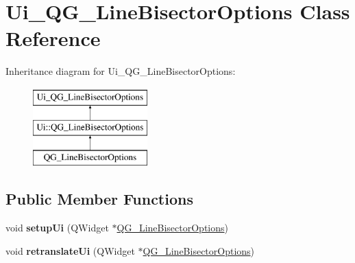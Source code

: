 \hypertarget{classUi__QG__LineBisectorOptions}{\section{Ui\-\_\-\-Q\-G\-\_\-\-Line\-Bisector\-Options Class Reference}
\label{classUi__QG__LineBisectorOptions}
}
Inheritance diagram for Ui\-\_\-\-Q\-G\-\_\-\-Line\-Bisector\-Options\-:\begin{figure}[H]
\begin{center}
\leavevmode
\includegraphics[height=3.000000cm]{classUi__QG__LineBisectorOptions}
\end{center}
\end{figure}
\subsection*{Public Member Functions}
\begin{DoxyCompactItemize}
\item 
\hypertarget{classUi__QG__LineBisectorOptions_a890c7c5da0795da01b5fa97848ee3d46}{void {\bfseries setup\-Ui} (Q\-Widget $\ast$\hyperlink{classQG__LineBisectorOptions}{Q\-G\-\_\-\-Line\-Bisector\-Options})}\label{classUi__QG__LineBisectorOptions_a890c7c5da0795da01b5fa97848ee3d46}

\item 
\hypertarget{classUi__QG__LineBisectorOptions_ad128d24b5d1d9100a3251e533c7ede27}{void {\bfseries retranslate\-Ui} (Q\-Widget $\ast$\hyperlink{classQG__LineBisectorOptions}{Q\-G\-\_\-\-Line\-Bisector\-Options})}\label{classUi__QG__LineBisectorOptions_ad128d24b5d1d9100a3251e533c7ede27}

\end{DoxyCompactItemize}
